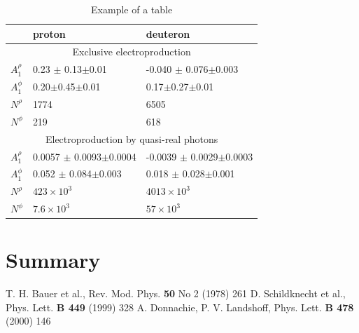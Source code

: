 \documentclass[epj,nopacs]{svjour}
\begin{document}
\begin{table}[h]
\begin{center}
\begin{tabular}{|l|l|l|}
\hline
\multicolumn{1}{|c|}{}& proton & deuteron\\
\hline
\multicolumn{3}{|c|}{Exclusive electroproduction}\\
\hline
$A^\rho_1$       & 0.23 $\pm$ 0.13$\pm$0.01 & -0.040 $\pm$ 0.076$\pm$0.003\\ 
$A^\phi_1$       & 0.20$\pm$0.45$\pm$0.01  & 0.17$\pm$0.27$\pm$0.01\\
$N^\rho$         &1774                   & 6505\\
$N^\phi$         & 219                   & 618 \\
\hline
\multicolumn{3}{|c|}{Electroproduction by quasi-real photons}\\
\hline
$A^\rho_1$  & 0.0057 $\pm$ 0.0093$\pm$0.0004  & -0.0039 $\pm$ 0.0029$\pm$0.0003\\ 
$A^\phi_1$  & 0.052 $\pm$ 0.084$\pm$0.003  & 0.018 $\pm$ 0.028$\pm$0.001\\
$N^\rho$    & $423\times10^{3}$ & $4013\times10^{3}$\\
$N^\phi$ & $7.6\times10^{3}$ &  $57\times10^{3}$ \\
\hline
\end{tabular}
\vspace*{0.3cm}
\caption{\baselineskip=0.38cm Example of a table}
\label{tab_asy}
\end{center}
\vspace*{-0.5cm}
\end{table}


\section{ Summary}

\begin{thebibliography}{}
\baselineskip=0.38cm
 T. H. Bauer et al., Rev. Mod. Phys. \textbf{50} No 2 (1978) 261  
D. Schildknecht et al., Phys. Lett. \textbf{B 449} (1999) 328
A. Donnachie, P. V. Landshoff, Phys. Lett. \textbf{B 478} (2000) 146

\end{thebibliography}
\end{document}
